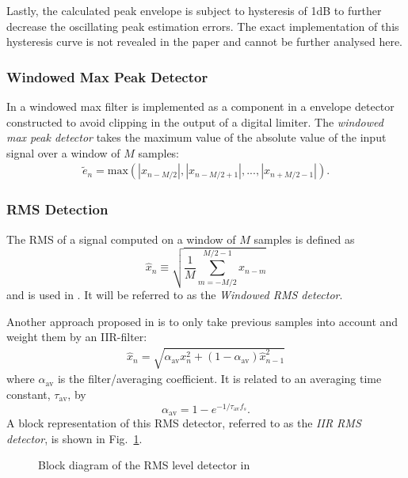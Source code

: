 \documentclass[../main2.tex]{subfiles}
\providecommand{\rootdir}{..}
\begin{document}
Lastly, the calculated peak envelope is subject to hysteresis of 1dB to further decrease the oscillating peak estimation errors. The exact implementation of this hysteresis curve is not revealed in the paper and cannot be further analysed here.

\subsubsection{Windowed Max Peak Detector}
In \cite{hamalainen2002smoothing} a windowed max filter is implemented as a component in a envelope detector constructed to avoid clipping in the output of a digital limiter. The \emph{windowed max peak detector} takes the maximum value of the absolute value of the input signal over a window of $M$ samples:
\begin{align}\label{eq:window_max_det}
\tilde{e}_n = \text{max}(|x_{n-M/2}|,|x_{n-M/2+1}|,..., |x_{n+M/2-1}|).
\end{align}

\subsubsection{RMS Detection}
The RMS of a signal computed on a window of $M$ samples is defined as
\begin{equation}
\hat{x}_n \equiv \sqrt{ \frac{1}{M} \sum_{m=-M/2}^{M/2-1} x_{n-m}}
\end{equation}
and is used in \cite{reiss2010rev}\cite{bosi1991low}. It will be referred to as the \emph{Windowed RMS detector}.

Another approach proposed in \cite{mcnally1984dynamic} is to only take previous samples into account and weight them by an IIR-filter:
\begin{align*}
\hat{x}_n = \sqrt{\alpha_{\text{av}} x_{n}^2+ (1-\alpha_{\text{av}}) \hat{x}_{n-1}^2}
\end{align*}
where $\alpha_\text{av}$ is the filter/averaging coefficient. It is related to an averaging time constant, $\tau_\text{av}$, by 
\begin{equation}
\alpha_\text{av} = 1 - e^{-1/\tau_\text{av} f_s } \label{eq:average_coeff_def}.
\end{equation}
A block representation of this RMS detector, referred to as the \emph{IIR RMS detector}, is shown in Fig.~\ref{fig:block_mcnally_theory_rms}.
\begin{figure}[h]
\centerline{}
\caption{Block diagram of the RMS level detector in \cite{mcnally1984dynamic}}
\label{fig:block_mcnally_theory_rms}
\end{figure}
\end{document}
